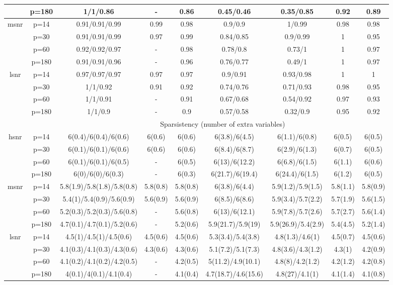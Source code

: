 \begin{table}[ht]
{\begin{tabular}{|c|c|ccccccc|}
   & p=180 & 1/1/0.86 & - & 0.86 & 0.45/0.46 & 0.35/0.85 & 0.92 & 0.89 \\ 
  \midrule\multirow{4}[2]{*}{msnr} & p=14 & 0.91/0.91/0.99 & 0.99 & 0.98 & 0.9/0.9 & 1/0.99 & 0.98 & 0.98 \\ 
   & p=30 & 0.91/0.91/0.99 & 0.97 & 0.99 & 0.84/0.85 & 0.9/0.99 & 1 & 0.95 \\ 
   & p=60 & 0.92/0.92/0.97 & - & 0.98 & 0.78/0.8 & 0.73/1 & 1 & 0.97 \\ 
   & p=180 & 0.91/0.91/0.96 & - & 0.96 & 0.76/0.77 & 0.49/1 & 1 & 0.97 \\ 
  \midrule\multirow{4}[2]{*}{lsnr} & p=14 & 0.97/0.97/0.97 & 0.97 & 0.97 & 0.9/0.91 & 0.93/0.98 & 1 & 1 \\ 
   & p=30 & 1/1/0.92 & 0.91 & 0.92 & 0.74/0.76 & 0.71/0.93 & 0.98 & 0.95 \\ 
   & p=60 & 1/1/0.91 & - & 0.91 & 0.67/0.68 & 0.54/0.92 & 0.97 & 0.93 \\ 
   & p=180 & 1/1/0.9 & - & 0.9 & 0.57/0.58 & 0.32/0.9 & 0.95 & 0.92 \\ 
   \midrule 
 \multicolumn{1}{|c}{} &       & \multicolumn{7}{c|}{Sparsistency (number of extra variables)} \\
\midrule\multirow{4}[2]{*}{hsnr} & p=14 & 6(0.4)/6(0.4)/6(0.6) & 6(0.6) & 6(0.6) & 6(3.8)/6(4.5) & 6(1.1)/6(0.8) & 6(0.5) & 6(0.5) \\ 
   & p=30 & 6(0.1)/6(0.1)/6(0.6) & 6(0.6) & 6(0.6) & 6(8.4)/6(8.7) & 6(2.9)/6(1.3) & 6(0.7) & 6(0.5) \\ 
   & p=60 & 6(0.1)/6(0.1)/6(0.5) & - & 6(0.5) & 6(13)/6(12.2) & 6(6.8)/6(1.5) & 6(1.1) & 6(0.6) \\ 
   & p=180 & 6(0)/6(0)/6(0.3) & - & 6(0.3) & 6(21.7)/6(19.4) & 6(24.4)/6(1.5) & 6(1.2) & 6(0.5) \\ 
  \midrule\multirow{4}[2]{*}{msnr} & p=14 & 5.8(1.9)/5.8(1.8)/5.8(0.8) & 5.8(0.8) & 5.8(0.8) & 6(3.8)/6(4.4) & 5.9(1.2)/5.9(1.5) & 5.8(1.1) & 5.8(0.9) \\ 
   & p=30 & 5.4(1)/5.4(0.9)/5.6(0.9) & 5.6(0.9) & 5.6(0.9) & 6(8.5)/6(8.6) & 5.9(3.4)/5.7(2.2) & 5.7(1.9) & 5.6(1.5) \\ 
   & p=60 & 5.2(0.3)/5.2(0.3)/5.6(0.8) & - & 5.6(0.8) & 6(13)/6(12.1) & 5.9(7.8)/5.7(2.6) & 5.7(2.7) & 5.6(1.4) \\ 
   & p=180 & 4.7(0.1)/4.7(0.1)/5.2(0.6) & - & 5.2(0.6) & 5.9(21.7)/5.9(19) & 5.9(26.9)/5.4(2.9) & 5.4(4.5) & 5.2(1.4) \\ 
  \midrule\multirow{4}[2]{*}{lsnr} & p=14 & 4.5(1)/4.5(1)/4.5(0.6) & 4.5(0.6) & 4.5(0.6) & 5.3(3.4)/5.4(3.8) & 4.8(1.3)/4.6(1) & 4.5(0.7) & 4.5(0.6) \\ 
   & p=30 & 4.1(0.3)/4.1(0.3)/4.3(0.6) & 4.3(0.6) & 4.3(0.6) & 5.1(7.2)/5.1(7.3) & 4.8(3.6)/4.3(1.2) & 4.3(1) & 4.2(0.9) \\ 
   & p=60 & 4.1(0.2)/4.1(0.2)/4.2(0.5) & - & 4.2(0.5) & 5(11.2)/4.9(10.1) & 4.8(8)/4.2(1.2) & 4.2(1.2) & 4.2(0.8) \\ 
   & p=180 & 4(0.1)/4(0.1)/4.1(0.4) & - & 4.1(0.4) & 4.7(18.7)/4.6(15.6) & 4.8(27)/4.1(1) & 4.1(1.4) & 4.1(0.8) \\ 
   \bottomrule 
\end{tabular}
}
\end{table}
